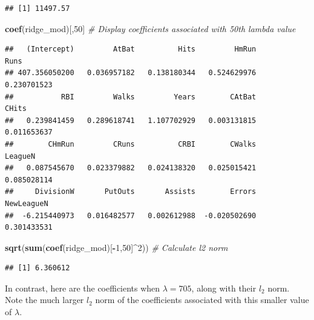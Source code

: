 \documentclass[openany]{book}
\newenvironment{Shaded}{\begin{snugshade}}{\end{snugshade}}
\newcommand{\CommentTok}[1]{\textcolor[rgb]{0.56,0.35,0.01}{\textit{#1}}}
\newcommand{\DecValTok}[1]{\textcolor[rgb]{0.00,0.00,0.81}{#1}}
\newcommand{\KeywordTok}[1]{\textcolor[rgb]{0.13,0.29,0.53}{\textbf{#1}}}
\newcommand{\NormalTok}[1]{#1}
\newcommand{\OperatorTok}[1]{\textcolor[rgb]{0.81,0.36,0.00}{\textbf{#1}}}
\begin{document}
\begin{Shaded}
\end{Shaded}

\begin{verbatim}
## [1] 11497.57
\end{verbatim}

\begin{Shaded}
\begin{Highlighting}[]
\KeywordTok{coef}\NormalTok{(ridge_mod)[,}\DecValTok{50}\NormalTok{] }\CommentTok{# Display coefficients associated with 50th lambda value}
\end{Highlighting}
\end{Shaded}

\begin{verbatim}
##   (Intercept)         AtBat          Hits         HmRun          Runs 
## 407.356050200   0.036957182   0.138180344   0.524629976   0.230701523 
##           RBI         Walks         Years        CAtBat         CHits 
##   0.239841459   0.289618741   1.107702929   0.003131815   0.011653637 
##        CHmRun         CRuns          CRBI        CWalks       LeagueN 
##   0.087545670   0.023379882   0.024138320   0.025015421   0.085028114 
##     DivisionW       PutOuts       Assists        Errors    NewLeagueN 
##  -6.215440973   0.016482577   0.002612988  -0.020502690   0.301433531
\end{verbatim}

\begin{Shaded}
\begin{Highlighting}[]
\KeywordTok{sqrt}\NormalTok{(}\KeywordTok{sum}\NormalTok{(}\KeywordTok{coef}\NormalTok{(ridge_mod)[}\OperatorTok{-}\DecValTok{1}\NormalTok{,}\DecValTok{50}\NormalTok{]}\OperatorTok{^}\DecValTok{2}\NormalTok{)) }\CommentTok{# Calculate l2 norm}
\end{Highlighting}
\end{Shaded}

\begin{verbatim}
## [1] 6.360612
\end{verbatim}

In contrast, here are the coefficients when \(\lambda = 705\), along with their \(l_2\)
norm. Note the much larger \(l_2\) norm of the coefficients associated with this
smaller value of \(\lambda\).
\end{document}
